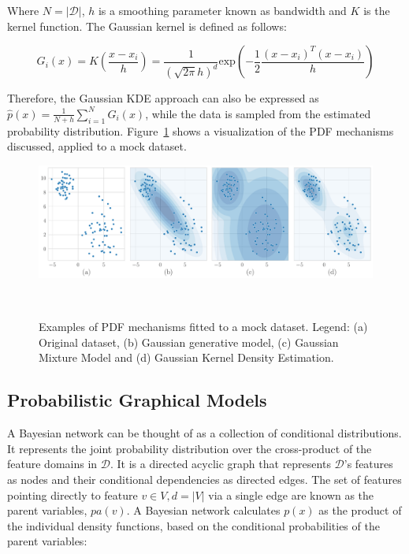 Where $N = |\mathcal{D}|$, $h$ is a smoothing parameter known as bandwidth and
$K$ is the kernel function. The Gaussian kernel is defined as follows:

\begin{equation}
    G_i(x) = K\left(\frac{x-x_i}{h} \right) = \frac{1}{(\sqrt{2\pi} h)^d} 
    \text{exp}\left(-\frac{1}{2}\frac{(x-x_i)^T(x-x_i)}{h}\right) 
\end{equation}

Therefore, the Gaussian KDE approach can also be expressed as $\hat{p}(x) =
\frac{1}{N+h}\sum_{i=1}^{N}G_i(x)$, while the data is sampled from the
estimated probability distribution. Figure~\ref{fig:pdf-example} shows a
visualization of the PDF mechanisms discussed, applied to a mock dataset.

\begin{figure}
	\centering
	\includegraphics[width=.95\linewidth]{figures/synthetic-data-review/pdf-example}
    \caption[Examples of PDF mechanisms fitted to a mock dataset.]{%
        Examples of PDF mechanisms fitted to a mock dataset. Legend: (a)
        Original dataset, (b) Gaussian generative model, (c) Gaussian Mixture
        Model and (d) Gaussian Kernel Density Estimation.
    }~\label{fig:pdf-example}
\end{figure}

\subsection{Probabilistic Graphical Models}

A Bayesian network can be thought of as a collection of
conditional distributions. It represents the joint probability distribution
over the cross-product of the feature domains in $\mathcal{D}$. It is a
directed acyclic graph that represents $\mathcal{D}$'s features as nodes and
their conditional dependencies as directed edges. The set of features pointing
directly to feature $v \in V, d=|V|$ via a single edge are known as the parent
variables, $pa(v)$. A Bayesian network calculates $p(x)$ as the product of the
individual density functions, based on the conditional probabilities of the
parent variables:

